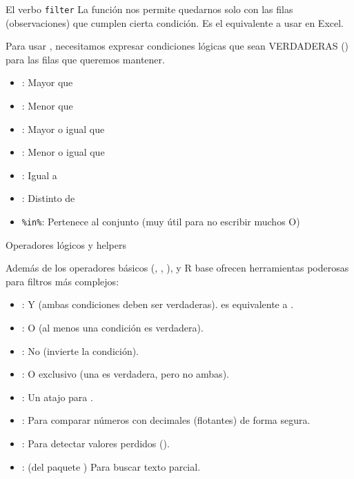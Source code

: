 \documentclass[8pt]{beamer}
\begin{document}
\begin{frame}[fragile]{El verbo \texttt{filter}}
La función  nos permite quedarnos solo con las filas (observaciones) que cumplen cierta condición. Es el equivalente a usar  en Excel.

Para usar , necesitamos expresar condiciones lógicas que sean VERDADERAS () para las filas que queremos mantener.

\begin{itemize}
	\item \rscript{>}: Mayor que
	\item \rscript{<}: Menor que
	\item \rscript{>=}: Mayor o igual que
	\item \rscript{<=}: Menor o igual que
	\item \rscript{==}: Igual a
	\item \rscript{!=}: Distinto de
	\item \lstinline[style=RScript, basicstyle=\normalsize\ttfamily]|%in%|: Pertenece al conjunto (muy útil para no escribir muchos O)
\end{itemize}
\end{frame}




\begin{frame}[fragile]{Operadores lógicos y helpers}

	Además de los operadores básicos (\rscript{==}, \rscript{>}, \rscript{<}),  y R base ofrecen herramientas poderosas para filtros más complejos:

	\begin{itemize}
		\item \rscript{&}: Y (ambas condiciones deben ser verdaderas).  es equivalente a .
		\item \rscript{|}: O (al menos una condición es verdadera).
		\item \rscript{!}: No (invierte la condición).
		\item {}: O exclusivo (una es verdadera, pero no ambas).
		\item {}: Un atajo para .
		\item {}: Para comparar números con decimales (flotantes) de forma segura.
		\item {}: Para detectar valores perdidos ().
		\item {}: (del paquete ) Para buscar texto parcial.
	\end{itemize}
\end{frame}
\end{document}
